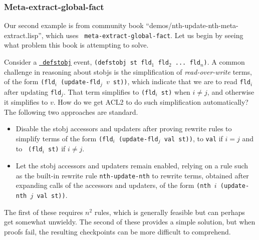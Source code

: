 \subsubsection{Meta-extract-global-fact}

Our second example is from community book
  ``demos/nth-update-nth-meta-extract.lisp'', which uses {\tt
  meta-extract-global-fact}.  Let us begin by seeing what problem this
book is attempting to solve.



Consider a
\href{http://www.cs.utexas.edu/users/moore/acl2/manuals/current/manual/index.html?topic=ACL2\_\_\_\_DEFSTOBJ}{\underline{\tt
    defstobj}} event, {\tt (defstobj st fld$_1$ fld$_2$ ... fld$_n$)}.
A common challenge in reasoning about stobjs is the simplification of
{\em read-over-write} terms, of the form {\tt (fld$_i$ (update-fld$_j$
  $v$ st))}, which indicate that we are to read {\tt fld$_i$} after
updating {\tt fld$_j$}.  That term simplifies to {\tt (fld$_i$ st)}
when $i \neq j$, and otherwise it simplifies to $v$.  How do we get
ACL2 to do such simplification automatically?  The following two
approaches are standard.

\begin{itemize}

\item Disable the stobj accessors and updaters after proving
  rewrite rules to simplify terms of the form {\tt (fld$_i$
    (update-fld$_j$ val st))}, to {\tt val} if $i = j$ and to {\tt
    (fld$_i$ st)} if $i \neq j$.

\item Let the stobj accessors and updaters remain enabled, relying on
  a rule such as the built-in rewrite rule {\tt nth-update-nth} to
  rewrite terms, obtained after expanding calls of the accessors and
  updaters, of the form {\tt (nth $i$ (update-nth $j$ val st))}.

\end{itemize}

\noindent The first of these requires $n^2$ rules, which is generally feasible
but can perhaps get somewhat unwieldy.  The second of these provides a
simple solution, but when proofs fail, the resulting checkpoints can
be more difficult to comprehend.

